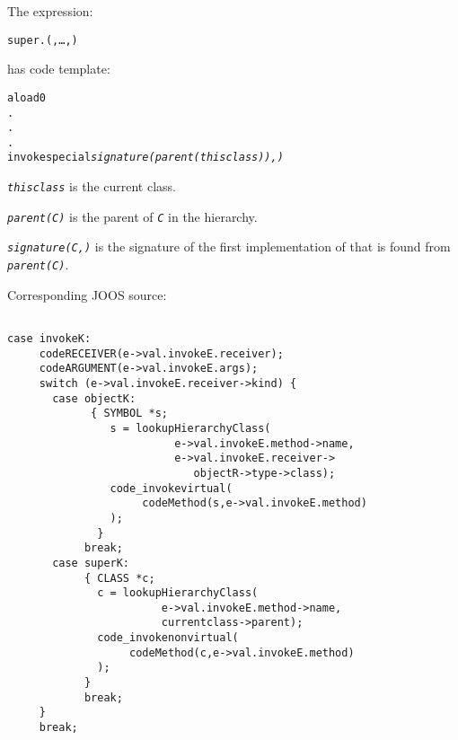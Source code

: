 \begin{slide*}
The expression:
 
\begin{scriptsize}
\begin{alltt}
    super.(,\ldots,)
\end{alltt}
\end{scriptsize}
 
has code template:
 
\begin{scriptsize}
\begin{alltt}
    aload 0
    .
    .
    .
    invokespecial {\em signature(parent(thisclass)),)}

\end{alltt}
\end{scriptsize}

{\tt\em thisclass} is the current class.
 
{\tt\em parent(C)} is the parent of {\tt\em C} in the hierarchy.
 
{\tt\em signature(C,)} is the signature of the first implementation
of  that is found from {\tt\em parent(C)}.
\vfil
\end{slide*}

\begin{slide*}
Corresponding JOOS source:
 
\begin{scriptsize}
\begin{verbatim}

case invokeK:
     codeRECEIVER(e->val.invokeE.receiver);
     codeARGUMENT(e->val.invokeE.args);
     switch (e->val.invokeE.receiver->kind) {
       case objectK:
             { SYMBOL *s;
                s = lookupHierarchyClass(
                          e->val.invokeE.method->name,
                          e->val.invokeE.receiver->
                             objectR->type->class);
                code_invokevirtual(
                     codeMethod(s,e->val.invokeE.method)
                );
              }
            break;
       case superK:
            { CLASS *c;
              c = lookupHierarchyClass(
                        e->val.invokeE.method->name,
                        currentclass->parent);
              code_invokenonvirtual(
                   codeMethod(c,e->val.invokeE.method)
              );
            }
            break;
     }
     break;
\end{verbatim}
\end{scriptsize}

\vfil
\end{slide*}
 
